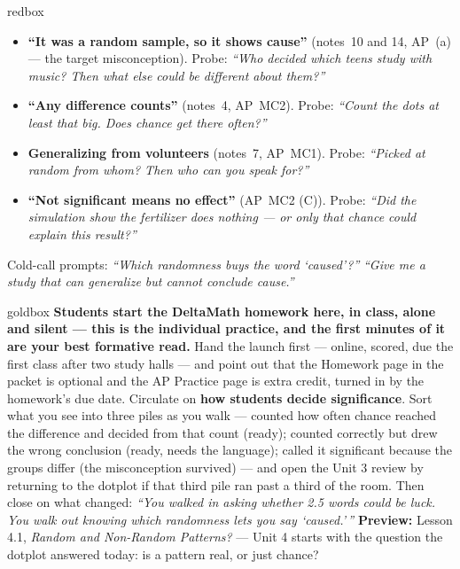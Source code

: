 \documentclass[10pt]{article}
\begin{document}
\boxguard
\begin{skillbox}{redbox}
\begin{itemize}[leftmargin=1.2em, nosep]
  \item \textbf{``It was a random sample, so it shows cause''} (notes~10 and 14,
        AP~(a) --- the target misconception). Probe: \emph{``Who decided which teens study with
        music? Then what else could be different about them?''}
  \item \textbf{``Any difference counts''} (notes~4, AP~MC2). Probe: \emph{``Count the dots
        at least that big. Does chance get there often?''}
  \item \textbf{Generalizing from volunteers} (notes~7, AP~MC1). Probe: \emph{``Picked at
        random from whom? Then who can you speak for?''}
  \item \textbf{``Not significant means no effect''} (AP~MC2 (C)). Probe: \emph{``Did the
        simulation show the fertilizer does nothing --- or only that chance could explain
        this result?''}
\end{itemize}
Cold-call prompts: \emph{``Which randomness buys the word `caused'?''} \quad
\emph{``Give me a study that can generalize but cannot conclude cause.''}
\end{skillbox}

\boxguard
\begin{skillbox}{goldbox}
\textbf{Students start the DeltaMath homework here, in class, alone and silent --- this is the
individual practice, and the first minutes of it are your best formative read.} Hand the launch
first --- online, scored, due the first class after two study halls --- and point out that the
Homework page in the packet is optional and the AP Practice page is extra credit, turned in by
the homework's due date. Circulate on \textbf{how students decide significance}. Sort what you
see into three piles as you walk --- counted how often chance reached the difference and decided
from that count (ready); counted correctly but drew the wrong conclusion (ready, needs the
language); called it significant because the groups differ (the misconception survived) --- and
open the Unit 3 review by returning to the dotplot if that third pile ran past a third of the
room. Then close on what changed: \emph{``You walked in asking
whether 2.5 words could be luck. You walk out knowing which randomness lets you say
`caused.'\,''} \textbf{Preview:} Lesson 4.1, \emph{Random and Non-Random Patterns?} --- Unit 4
starts with the question the dotplot answered today: is a pattern real, or just chance?
\end{skillbox}
\end{document}
